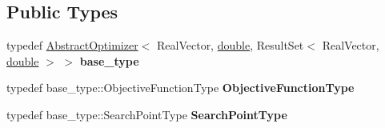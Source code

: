 \subsection*{Public Types}
\begin{DoxyCompactItemize}
\item 
typedef \hyperlink{classAbstractOptimizer}{Abstract\+Optimizer}$<$ Real\+Vector, \hyperlink{classdouble}{double}, Result\+Set$<$ Real\+Vector, \hyperlink{classdouble}{double} $>$ $>$ {\bfseries base\+\_\+type}\hypertarget{classAbstractPreselecter_a9d56c27fc2428c60a99dea0504717794}{}\label{classAbstractPreselecter_a9d56c27fc2428c60a99dea0504717794}

\item 
typedef base\+\_\+type\+::\+Objective\+Function\+Type {\bfseries Objective\+Function\+Type}\hypertarget{classAbstractPreselecter_ae3b0b31dee2296bb9ab385b80ac6a27e}{}\label{classAbstractPreselecter_ae3b0b31dee2296bb9ab385b80ac6a27e}

\item 
typedef base\+\_\+type\+::\+Search\+Point\+Type {\bfseries Search\+Point\+Type}\hypertarget{classAbstractPreselecter_a0b3b8c0fcb55a3f75337939d1cae182e}{}\label{classAbstractPreselecter_a0b3b8c0fcb55a3f75337939d1cae182e}

\end{DoxyCompactItemize}
